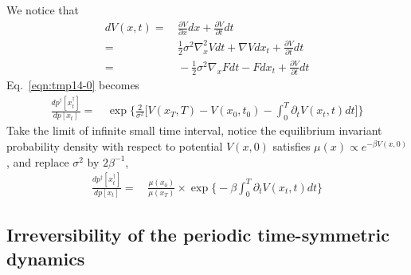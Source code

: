 \documentclass[aps, pre, preprint,unsortedaddress,a4paper,onecolumn,showkeys]{revtex4}
\newcommand{\mymu}{\mu}
\begin{document}
We notice that
\begin{align}\nonumber
  dV(x, t) = &\, \frac{\partial V}{\partial x} dx + \frac{\partial V}{\partial t} dt\\\nonumber
  =&\,
  \frac12 \sigma^2 \nabla^2_x V dt +  \nabla V dx_t + \frac{\partial V}{\partial t} dt \\
  =&\,
  -\frac12 \sigma^2 \nabla_x F dt -  F dx_t + \frac{\partial V}{\partial t} dt
\end{align}
Eq.~\eqref{eqn:tmp14-0} becomes
\begin{align}
  \frac{  dp^\dagger[x^\dagger_t] }{ dp[x_t]}
  =&\,
  \exp\bigg\{
  \frac2{\sigma^2}\bigg[
  V(x_T,T) - V(x_0,t_0) - \int_0^T\partial_tV(x_t,t)dt
  \bigg]
  \bigg\}
\end{align}
Take the limit of infinite small time interval, notice the equilibrium
invariant probability density with respect to potential $V(x,0)$ satisfies $\mymu(x) \propto e^{-\beta V(x,0)}$, and replace $\sigma^2$ by $2\beta^{-1}$,
\begin{align}
  \frac{  dp^\dagger[x^\dagger_t] }{ dp[x_t]}
  =&\,
  \frac{\mymu(x_0)}{\mymu(x_T)}\times
  \exp\bigg\{
  - \beta\int_0^T\partial_tV(x_t,t)dt
  \bigg\}
\end{align}

\subsection{Irreversibility of the periodic time-symmetric dynamics}
\end{document}
